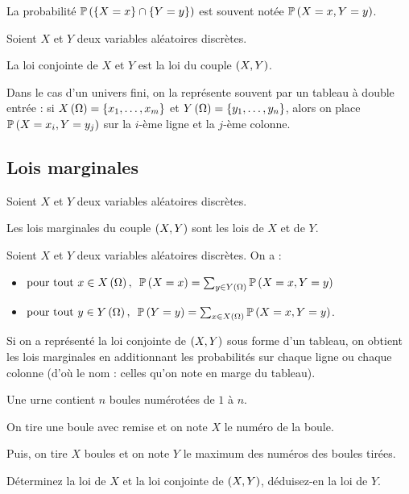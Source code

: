 La probabilité \(\mathbb{P}\left(\left\lbrace X=x\right\rbrace\cap\left\lbrace Y=y\right\rbrace\right)\) est souvent notée \(\mathbb{P}\left(X=x,Y=y\right)\).

\begin{defi}
Soient \(X\) et \(Y\) deux variables aléatoires discrètes.

La loi conjointe de \(X\) et \(Y\) est la loi du couple \(\left(X,Y\right)\).
\end{defi}

Dans le cas d'un univers fini, on la représente souvent par un tableau à double entrée : si \(X\left(\Omega\right)=\left\lbrace x_1,\dots,x_m\right\rbrace\) et \(Y\left(\Omega\right)=\left\lbrace y_1,\dots,y_n\right\rbrace\), alors on place \(\mathbb{P}\left(X=x_i,Y=y_j\right)\) sur la \(i\)-ème ligne et la \(j\)-ème colonne.

\subsection{Lois marginales}

\begin{defi}
Soient \(X\) et \(Y\) deux variables aléatoires discrètes.

Les lois marginales du couple \(\left(X,Y\right)\) sont les lois de \(X\) et de \(Y\).
\end{defi}

\begin{prop}
Soient \(X\) et \(Y\) deux variables aléatoires discrètes. On a :

\begin{itemize}
    \item \(\quantifs{\tpt x\in X\paren{\Omega}}\proba{X=x}=\sum_{y\in Y\paren{\Omega}}\proba{X=x,Y=y}\) \\
    \item \(\quantifs{\tpt y\in Y\paren{\Omega}}\proba{Y=y}=\sum_{x\in X\paren{\Omega}}\proba{X=x,Y=y}\).
\end{itemize}
\end{prop}

Si on a représenté la loi conjointe de \(\left(X,Y\right)\) sous forme d'un tableau, on obtient les lois marginales en additionnant les probabilités sur chaque ligne ou chaque colonne (d'où le nom  : celles qu'on note en marge du tableau).

\begin{exo}
Une urne contient \(n\) boules numérotées de \(1\) à \(n\).

On tire une boule avec remise et on note \(X\) le numéro de la boule.

Puis, on tire \(X\) boules et on note \(Y\) le maximum des numéros des boules tirées.

Déterminez la loi de \(X\) et la loi conjointe de \(\left(X,Y\right)\), déduisez-en la loi de \(Y\).
\end{exo}

